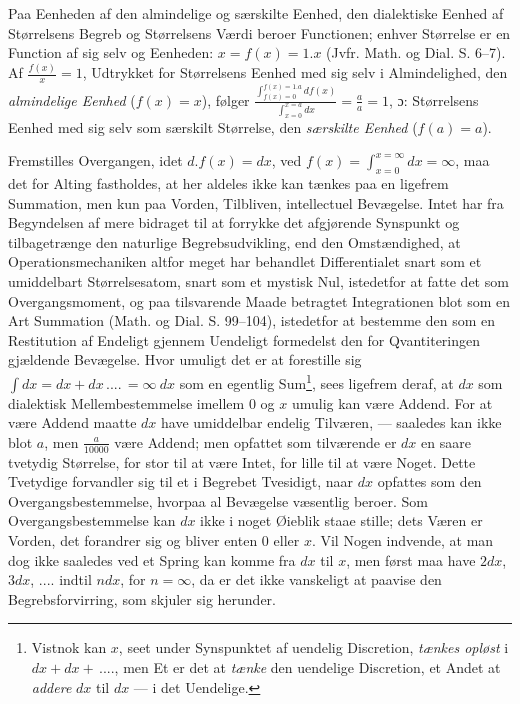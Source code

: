 \documentclass[12pt,a4paper]{book}
\begin{document}
Paa Eenheden af den almindelige og særskilte Eenhed, den dialektiske
Eenhed af Størrelsens Begreb og Størrelsens Værdi beroer Functionen;
enhver Størrelse er en Function af sig selv og Eenheden: $x = f(x) =
1. x$ (Jvfr. Math. og Dial. S. 6--7). Af $\frac{f(x)}{x} = 1$,
Udtrykket for Størrelsens Eenhed med sig selv i Almindelighed, den
\emph{almindelige Eenhed} ($f(x) = x$), følger
$\frac{\int_{f(x)=0}^{f(x)=1.a} df(x)}{\int_{x=0}^{x=a} dx} =
\frac{a}{a} = 1$, ɔ: Størrelsens Eenhed med sig selv som særskilt
Størrelse, den \emph{særskilte Eenhed} ($f(a) = a$).

Fremstilles Overgangen, idet $d.f(x) = dx$, ved $f(x) =
\int_{x=0}^{x=\infty} dx = \infty$, maa det for Alting fastholdes, at
her aldeles ikke kan tænkes paa en ligefrem Summation, men kun paa
Vorden, Tilbliven, intellectuel Bevægelse. Intet har fra Begyndelsen af
mere bidraget til at forrykke det afgjørende Synspunkt og
tilbagetrænge den naturlige Begrebsudvikling, end den Omstændighed, at
Operationsmechaniken altfor meget har behandlet Differentialet snart
som et umiddelbart Størrelsesatom, snart som et mystisk Nul, istedetfor
at fatte det
\setcounter{footnote}{0}
som Overgangsmoment, og paa tilsvarende Maade betragtet Integrationen
blot som en Art Summation (Math. og Dial. S. 99--104), istedetfor at
bestemme den som en Restitution af Endeligt gjennem Uendeligt
formedelst den for Qvantiteringen gjældende Bevægelse. Hvor umuligt det
er at forestille sig $\int dx = dx + dx\,....\,= \infty\ dx$ som en
egentlig Sum\footnote{Vistnok kan $x$, seet under Synspunktet af
uendelig Discretion, \emph{tænkes opløst} i $dx + dx +\,....$, men Et
er det at \emph{tænke} den uendelige Discretion, et Andet at
\emph{addere} $dx$ til $dx$ --- i det Uendelige.}, sees ligefrem deraf,
at $dx$ som dialektisk Mellembestemmelse imellem $0$ og $x$ umulig kan
være Addend. For at være Addend maatte $dx$ have umiddelbar endelig
Tilværen, --- saaledes kan ikke blot $a$, men $\frac{a}{10000}$ være
Addend; men opfattet som tilværende er $dx$ en saare tvetydig
Størrelse, for stor til at være Intet, for lille til at være Noget.
Dette Tvetydige forvandler sig til et i Begrebet Tvesidigt, naar $dx$
opfattes som den Overgangsbestemmelse, hvorpaa al Bevægelse væsentlig
beroer. Som Overgangsbestemmelse kan $dx$ ikke i noget Øieblik staae
stille; dets Væren er Vorden, det forandrer sig og bliver enten $0$
eller $x$. Vil Nogen indvende, at man dog ikke saaledes ved et Spring
kan komme fra $dx$ til $x$, men først maa have $2dx$, $3dx$, $....$
indtil $ndx$, for $n = \infty$, da er det ikke vanskeligt at paavise
den Begrebsforvirring, som skjuler sig herunder.
\end{document}
